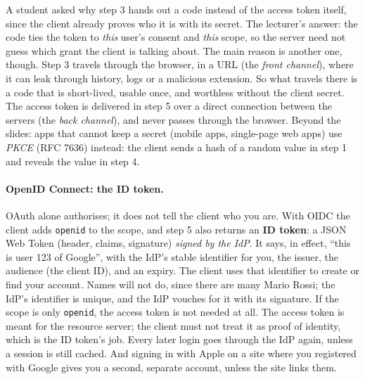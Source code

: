 \begin{remark}
A student asked why step 3 hands out a code instead of the access token itself, since the client already proves who it is with its secret. The lecturer's answer: the code ties the token to \emph{this} user's consent and \emph{this} scope, so the server need not guess which grant the client is talking about. The main reason is another one, though. Step 3 travels through the browser, in a URL (the \emph{front channel}), where it can leak through history, logs or a malicious extension. So what travels there is a code that is short-lived, usable once, and worthless without the client secret. The access token is delivered in step 5 over a direct connection between the servers (the \emph{back channel}), and never passes through the browser. Beyond the slides: apps that cannot keep a secret (mobile apps, single-page web apps) use \emph{PKCE} (RFC 7636) instead: the client sends a hash of a random value in step 1 and reveals the value in step 4.
\end{remark}

\paragraph{OpenID Connect: the ID token.} OAuth alone authorises; it does not tell the client who you are. With OIDC the client adds \texttt{openid} to the scope, and step 5 also returns an \textbf{ID token}: a JSON Web Token (header, claims, signature) \emph{signed by the IdP}. It says, in effect, \enquote{this is user 123 of Google}, with the IdP's stable identifier for you, the issuer, the audience (the client ID), and an expiry. The client uses that identifier to create or find your account. Names will not do, since there are many Mario Rossi; the IdP's identifier is unique, and the IdP vouches for it with its signature. If the scope is only \texttt{openid}, the access token is not needed at all. The access token is meant for the resource server; the client must not treat it as proof of identity, which is the ID token's job. Every later login goes through the IdP again, unless a session is still cached. And signing in with Apple on a site where you registered with Google gives you a second, separate account, unless the site links them.

